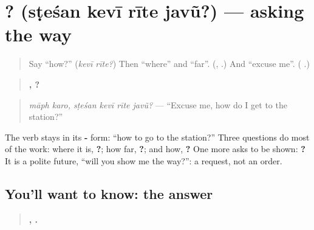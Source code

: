 \section[\texorpdfstring{\gu{સ્ટેશન} \gu{કેવી} \gu{રીતે} \gu{જવું}? (sṭeśan kevī rīte …)}{સ્ટેશન કેવી રીતે જવું? (sṭeśan kevī rīte …)}]{   ? (sṭeśan kevī rīte javũ?) — asking the way}

\label{lesson:GU-C279-kevi-rite-javu}



\begin{quote}
Say \textquotedblleft{}how?\textquotedblright{} (\emph{kevī rīte?}) Then \textquotedblleft{}where\textquotedblright{} and \textquotedblleft{}far\textquotedblright{}. (\textbf{}, \textbf{}.) And \textquotedblleft{}excuse me\textquotedblright{}. (\textbf{ }.)
\end{quote}

\begin{grammarlens}[title={Grammar Lens: three questions}]
\begin{quote}
\textbf{ ,    ?}
\end{quote}

\begin{quote}
\emph{māph karo, sṭeśan kevī rīte javũ?} — \textquotedblleft{}Excuse me, how do I get to the station?\textquotedblright{}
\end{quote}

The verb stays in its \textbf{-} form: \textquotedblleft{}how to go to the station?\textquotedblright{} Three questions do most of the work: where it is, \textbf{  ?}; how far, \textbf{  ?}; and how, \textbf{   ?} One more asks to be shown: \textbf{  ?} It is a polite future, \textquotedblleft{}will you show me the way?\textquotedblright{}: a request, not an order.
\end{grammarlens}

\subsection*{You'll want to know: the answer}
\begin{quote}
\textbf{ ,      .}
\end{quote}


